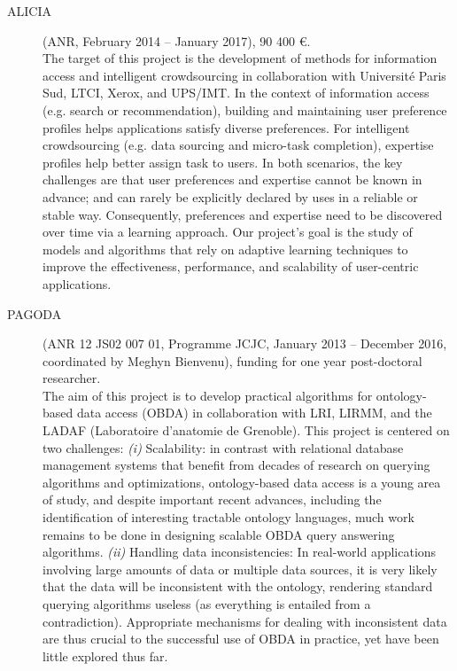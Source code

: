 \begin{description}
\item[ALICIA] (ANR, February 2014 -- January 2017), 90 400 \euro. \\
The target of this project is the development of methods for information access and intelligent crowdsourcing in collaboration with Universit{\'e} Paris Sud, LTCI, Xerox, and UPS/IMT. In the context of information access (e.g. search or recommendation), building and maintaining user preference profiles helps applications satisfy diverse preferences. For intelligent crowdsourcing (e.g. data sourcing and micro-task completion), expertise profiles help better assign task to users. In both scenarios, the key challenges are that user preferences and expertise cannot be known in advance; and can rarely be explicitly declared by uses in a reliable or stable way. Consequently, preferences and expertise need to be discovered over time via a learning approach. Our project’s goal is the study of models and algorithms that rely on adaptive learning techniques to improve the effectiveness, performance, and scalability of user-centric applications.

\item[PAGODA] (ANR 12 JS02 007 01, Programme JCJC, January 2013 -- December 2016, coordinated by Meghyn Bienvenu), funding for one year post-doctoral researcher. \\
The aim of this project is to develop practical algorithms for ontology-based data access (OBDA) in collaboration with LRI, LIRMM, and the LADAF (Laboratoire d'anatomie de Grenoble). This project is centered on two challenges:
\textit{(i)} Scalability: in contrast with relational database management systems that benefit from decades of research on querying algorithms and optimizations, ontology-based data access is a young area of study, and despite important recent advances, including the identification of interesting tractable ontology languages, much work remains to be done in designing scalable OBDA query answering algorithms.
\textit{(ii)} Handling data inconsistencies: In real-world applications involving large amounts of data or multiple data sources, it is very likely that the data will be inconsistent with the ontology, rendering standard querying algorithms useless (as everything is entailed from a contradiction). Appropriate mechanisms for dealing with inconsistent data are thus crucial to the successful use of OBDA in practice, yet have been little explored thus far.


\end{description}
